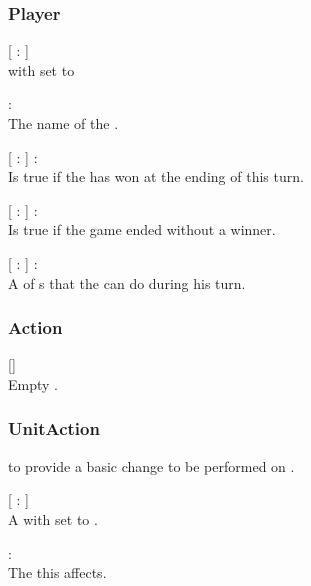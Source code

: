 \subsubsection{Player}
\begin{dlist}
  \item {}[  :  ]\\
   with  set to 
  
  \item {} : \\
  The name of the .
  
  \item {}[  :  ] : \\
  Is true if the  has won at the ending of this turn.
  
  \item {}[  :  ] : \\
  Is true if the game ended without a winner.
  
  \item {}[  :  ] : \\
  A  of s that the  can do during his turn.
\end{dlist}

\subsubsection{Action}
\begin{dlist}
  \item {}[]\\
  Empty .
\end{dlist}

\subsubsection{UnitAction}
   to provide a basic change to be performed on .

\begin{dlist}
  \item {}[  :  ]\\
  A  with  set to .
  
  \item {} : \\
  The  this  affects.
\end{dlist}

